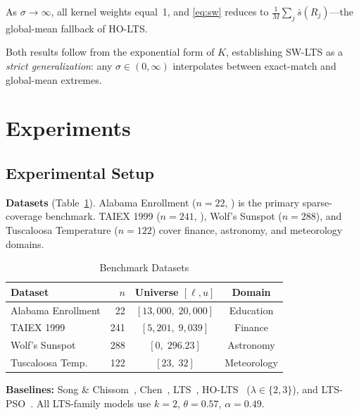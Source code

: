 \documentclass{llncs}
\begin{document}
\begin{proposition}
\label{prop:sigmainf}
As $\sigma\to\infty$, all kernel weights equal~1, and \eqref{eq:sw}
reduces to $\frac{1}{M}\sum_j\bar{s}(R_j)$---the global-mean fallback
of HO-LTS.
\end{proposition}

Both results follow from the exponential form of $K$, establishing
SW-LTS as a \emph{strict generalization}: any $\sigma\in(0,\infty)$
interpolates between exact-match and global-mean extremes.

\section{Experiments}
\label{sec:exp}

\subsection{Experimental Setup}

\textbf{Datasets} (Table~\ref{tab:datasets}). Alabama Enrollment
($n=22$, \cite{song1993}) is the primary sparse-coverage benchmark.
TAIEX 1999 ($n=241$, \cite{yu2005}), Wolf's Sunspot ($n=288$), and
Tuscaloosa Temperature ($n=122$) cover finance, astronomy, and
meteorology domains.

\begin{table}[htbp]
\caption{Benchmark Datasets}
\label{tab:datasets}
\centering
\begin{tabular}{@{}lrcc@{}}
\toprule
Dataset & $n$ & Universe $[\ell,u]$ & Domain \\
\midrule
Alabama Enrollment & 22  & $[13{,}000,\;20{,}000]$ & Education \\
TAIEX 1999         & 241 & $[5{,}201,\;9{,}039]$   & Finance \\
Wolf's Sunspot     & 288 & $[0,\;296.23]$           & Astronomy \\
Tuscaloosa Temp.   & 122 & $[23,\;32]$              & Meteorology \\
\bottomrule
\end{tabular}
\end{table}

\textbf{Baselines:} Song \& Chissom~\cite{song1993}, Chen~\cite{chen1996},
LTS~\cite{hieu2020lts}, HO-LTS~\cite{hieu2021holts} ($\lambda\in\{2,3\}$),
and LTS-PSO~\cite{hieu2022ltspso}. All LTS-family models use $k=2$,
$\theta=0.57$, $\alpha=0.49$.
\end{document}
